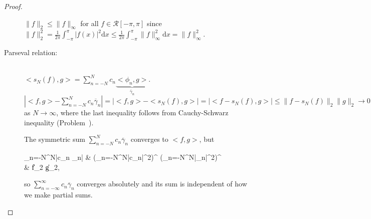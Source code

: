 \begin{thm}[16]
\begin{proof}
\begin{description}
			      \begin{note}
				      $\|f\|_2 \le  \|f\|_{\infty}$ for all $f \in \mathscr{R}[-\pi,\pi]$ since $\|f\|_2^2=\frac{1}{2\pi} \int_{-\pi}^{\pi}{\left|f(x)\right|^2\mathrm{d}x}\le \frac{1}{2\pi} \int_{-\pi}^{\pi}{\|f\|_{\infty}^2\mathrm{d}x}=\|f\|_{\infty}^2$.
			      \end{note}
			\item[Parseval relation:]\hfill \\
			      $<s_N(f),g> = \sum_{n=-N}^{N}{c_{n} \underbrace{< \phi_n , g>}_{\overline{\gamma}_n}}$.\\
			      $\left|<f ,g > - \sum_{n=-N}^{N}{c_{n}\overline{\gamma}_n}\right|= \left|<f,g> - <s_N(f),g>\right|= \left|<f-s_N(f),g>\right| \le  \|f-s_N(f)\|_2 \|g\|_2 \to 0
			      $ as $N\to \infty$, where the last inequality follows from Cauchy-Schwarz inequality (Problem~).
			      \begin{note}
				      The symmetric sum $\sum_{n=-N}^{N}{c_{n} \overline{\gamma}_n}$ converges to $<f,g>$, but
				      \begin{flalign*}
					      \sum_{n=-N}^{N}{\left|c_{n} \overline{\gamma}_n\right|} & \le \left(\sum_{n=-N}^{N}{\left|c_n\right|^2}\right)^{} \cdot \left(\sum_{n=-N}^{N}{\left|\overline{\gamma}_n\right|^2}\right)^{} \\
					                                                              & \le \|f\|_2 \cdot \|g\|_2,
				      \end{flalign*}
				      so $\sum_{n=-\infty}^{\infty}{c_n \overline{\gamma}_n}$ converges absolutely and its sum is independent of how we make partial sums.
			      \end{note}
		\end{description}
	\end{proof}
\end{thm}
